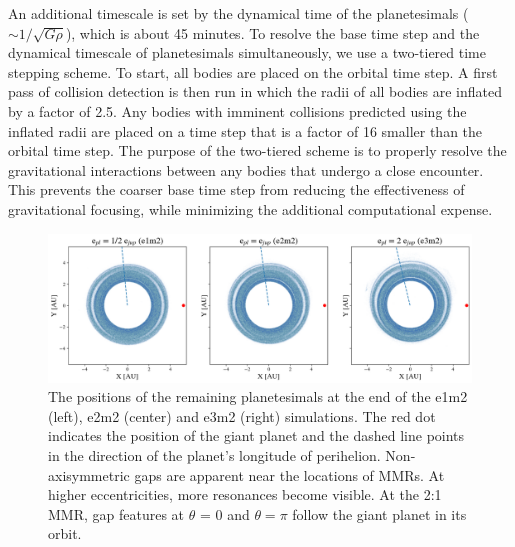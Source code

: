 \documentclass[twocolumn]{aastex63}
\begin{document}
An additional timescale is set by the dynamical time of the planetesimals ($\sim 1/\sqrt{G \rho}$), which is about 45 minutes. To 
resolve the base time step and the dynamical timescale of planetesimals simultaneously, we use a two-tiered time stepping scheme. 
To start, all bodies are placed on the orbital time step. A first pass of collision detection is then run in 
which the radii of all bodies are inflated by a factor of 2.5. Any bodies with imminent collisions predicted using the inflated radii are 
placed on a time step that is a factor of 16 smaller than the orbital time step. The purpose of the two-tiered scheme is to properly resolve 
the gravitational interactions between any bodies that undergo a close encounter. This prevents the coarser base time step from 
reducing the effectiveness of gravitational focusing, while minimizing the additional computational expense.

\begin{figure}
\begin{center}
    \includegraphics[width=\textwidth]{figures/xy.png}
    \caption{The positions of the remaining planetesimals at the end of the e1m2 (left), e2m2 (center) and e3m2 (right) simulations. The red dot 
    indicates the position of the giant planet and the dashed line points in the direction of the planet's longitude of perihelion. Non-axisymmetric gaps 
    are apparent near the locations of MMRs. At higher eccentricities, more resonances become visible. At the 2:1 MMR, gap features at $\theta$ = 0 
    and $\theta = \pi$ follow the giant planet in its orbit.\label{fig:xy}}
\end{center}
\end{figure}
\end{document}
